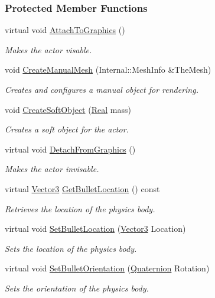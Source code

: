 \subsubsection*{Protected Member Functions}
\begin{DoxyCompactItemize}
\item 
virtual void \hyperlink{classMezzanine_1_1ActorSoft_af2e618dd176d910834f146c62efe8f19}{Attach\-To\-Graphics} ()
\begin{DoxyCompactList}\small\item\em Makes the actor visable. \end{DoxyCompactList}\item 
void \hyperlink{classMezzanine_1_1ActorSoft_a52ef123f82ac082991da5a517f77adf8}{Create\-Manual\-Mesh} (Internal\-::\-Mesh\-Info \&The\-Mesh)
\begin{DoxyCompactList}\small\item\em Creates and configures a manual object for rendering. \end{DoxyCompactList}\item 
void \hyperlink{classMezzanine_1_1ActorSoft_ab0ee1ceadedb3d92295cce649749cb7a}{Create\-Soft\-Object} (\hyperlink{namespaceMezzanine_a726731b1a7df72bf3583e4a97282c6f6}{Real} mass)
\begin{DoxyCompactList}\small\item\em Creates a soft object for the actor. \end{DoxyCompactList}\item 
virtual void \hyperlink{classMezzanine_1_1ActorSoft_a3ec90b87480ba28553656eb10552f6d6}{Detach\-From\-Graphics} ()
\begin{DoxyCompactList}\small\item\em Makes the actor invisable. \end{DoxyCompactList}\item 
virtual \hyperlink{classMezzanine_1_1Vector3}{Vector3} \hyperlink{classMezzanine_1_1ActorSoft_a7d6f49acc1bf286fd46fb33a8c2798e4}{Get\-Bullet\-Location} () const 
\begin{DoxyCompactList}\small\item\em Retrieves the location of the physics body. \end{DoxyCompactList}\item 
virtual void \hyperlink{classMezzanine_1_1ActorSoft_a65115824bacb62ad58a68cf3d7fc8840}{Set\-Bullet\-Location} (\hyperlink{classMezzanine_1_1Vector3}{Vector3} Location)
\begin{DoxyCompactList}\small\item\em Sets the location of the physics body. \end{DoxyCompactList}\item 
virtual void \hyperlink{classMezzanine_1_1ActorSoft_abe282473ccb1f02c273be6efd620d83c}{Set\-Bullet\-Orientation} (\hyperlink{classMezzanine_1_1Quaternion}{Quaternion} Rotation)
\begin{DoxyCompactList}\small\item\em Sets the orientation of the physics body. \end{DoxyCompactList}\end{DoxyCompactItemize}
